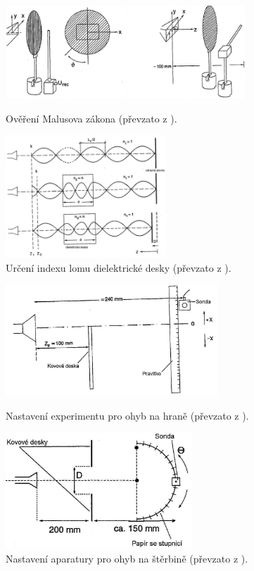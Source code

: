\documentclass[english]{article}
\begin{document}
	\begin{figure}[h!]
	\centering
	\begin{minipage}{.55\textwidth}
	  \centering
			\includegraphics[width=9cm]{att/polarizace_malus.pdf}
			\caption{Ověření Malusova zákona (převzato z  \cite{bib:zadani}).}
			\label{fig:polarizace_malus}
	\end{minipage}%
	\hfill
	\begin{minipage}{.35\textwidth}
	  \centering
			\includegraphics[width=6cm]{att/index_lomu_desky.jpg}
			\caption{Určení indexu lomu dielektrické desky (převzato z  \cite{bib:zadani}).}
			\label{fig:index_lomu_desky}
	\end{minipage}
	\end{figure}	
	
	\begin{figure}[h!]
	\centering
	\begin{minipage}{.50\textwidth}
	  \centering
			\includegraphics[width=8cm]{att/ohyb_na_hrane.jpg}
			\caption{Nastavení experimentu pro ohyb na hraně (převzato z  \cite{bib:zadani}). }
			\label{fig:ohyb_na_hrane}
	\end{minipage}%
	\hfill
	\begin{minipage}{.40\textwidth}
	  \centering
			\includegraphics[width=7cm]{att/ohyb_na_sterbine.jpg}
			\caption{Nastavení aparatury pro ohyb na štěrbině (převzato z  \cite{bib:zadani}).}
			\label{fig:ohyb_na_sterbine}
	\end{minipage}
	\end{figure}	
	
\end{document}
